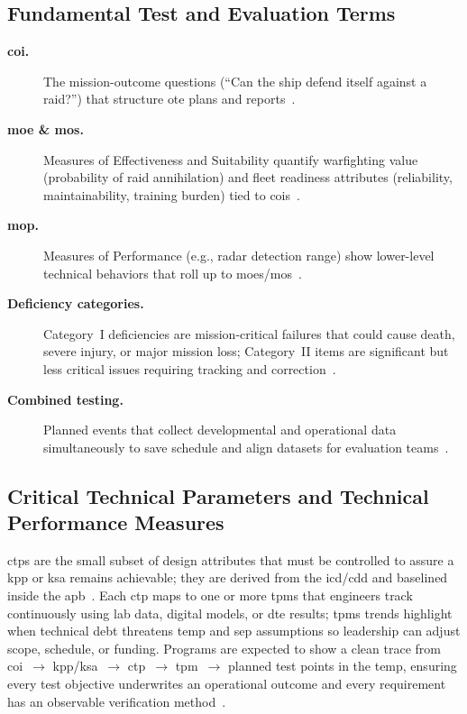 \documentclass[../main.tex]{subfiles}
\begin{document}
\subsection{Fundamental Test and Evaluation Terms}
\begin{description}
  \item[\textbf{\ac{coi}.}] The mission-outcome questions (``Can the ship defend itself against a raid?'') that structure \ac{ote} plans and reports~\autocite{edo-3-5-6-test-eval-part-ii-2025}.
  \item[\textbf{\ac{moe} \& \ac{mos}.}] Measures of Effectiveness and Suitability quantify warfighting value (probability of raid annihilation) and fleet readiness attributes (reliability, maintainability, training burden) tied to \acp{coi}~\autocite{edo-3-5-6-test-eval-part-ii-2025}.
  \item[\textbf{\ac{mop}.}] Measures of Performance (e.g., radar detection range) show lower-level technical behaviors that roll up to \acp{moe}/\ac{mos}~\autocite{edo-3-5-5-test-eval-part-i-2025}.
  \item[\textbf{Deficiency categories.}] Category~I deficiencies are mission-critical failures that could cause death, severe injury, or major mission loss; Category~II items are significant but less critical issues requiring tracking and correction~\autocite{edo-3-5-6-test-eval-part-ii-2025}.
  \item[\textbf{Combined testing.}] Planned events that collect developmental and operational data simultaneously to save schedule and align datasets for evaluation teams~\autocite{DoDI5000-02}.
\end{description}

\subsection{Critical Technical Parameters and Technical Performance Measures}
\acp{ctp} are the small subset of design attributes that must be controlled to assure a \ac{kpp} or \ac{ksa} remains achievable; they are derived from the \ac{icd}/\ac{cdd} and baselined inside the \ac{apb}~\autocite{DoDI5000-85}. Each \ac{ctp} maps to one or more \acp{tpm} that engineers track continuously using lab data, digital models, or \ac{dte} results; \acp{tpm} trends highlight when technical debt threatens \ac{temp} and \ac{sep} assumptions so leadership can adjust scope, schedule, or funding. Programs are expected to show a clean trace from \ac{coi}~$\rightarrow$ \ac{kpp}/\ac{ksa}~$\rightarrow$ \ac{ctp}~$\rightarrow$ \ac{tpm}~$\rightarrow$ planned test points in the \ac{temp}, ensuring every test objective underwrites an operational outcome and every requirement has an observable verification method~\autocite{DoDI5000-89,edo-3-5-5-test-eval-part-i-2025}.
\end{document}
